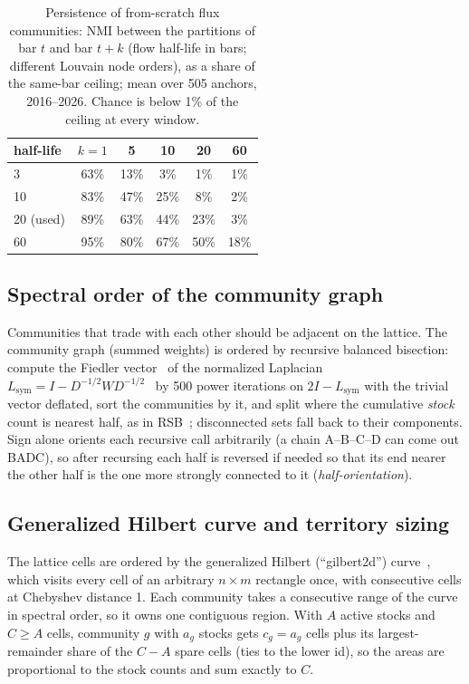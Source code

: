 \documentclass[preprint,3p,twocolumn]{elsarticle}
\begin{document}
\begin{table}[!htbp]
\centering\footnotesize
\begin{tabular}{lccccc}
\hline
half-life & $k=1$ & 5 & 10 & 20 & 60\\
\hline
3 & 63\% & 13\% & 3\% & 1\% & 1\%\\
10 & 83\% & 47\% & 25\% & 8\% & 2\%\\
20 (used) & 89\% & 63\% & 44\% & 23\% & 3\%\\
60 & 95\% & 80\% & 67\% & 50\% & 18\%\\
\hline
\end{tabular}
\caption{Persistence of from-scratch flux communities: NMI between the partitions of bar $t$ and bar $t+k$ (flow half-life in bars; different Louvain node orders), as a share of the same-bar ceiling; mean over 505 anchors, 2016--2026. Chance is below 1\% of the ceiling at every window.}
\label{Table:persist}
\end{table}

\subsection{Spectral order of the community graph}
Communities that trade with each other should be adjacent on the lattice. The community graph (summed weights) is ordered by recursive balanced bisection: compute the Fiedler vector~\cite{fiedler} of the normalized Laplacian $L_{\mathrm{sym}}=I-D^{-1/2}WD^{-1/2}$~\cite{chung} by 500 power iterations on $2I-L_{\mathrm{sym}}$ with the trivial vector deflated, sort the communities by it, and split where the cumulative \emph{stock} count is nearest half, as in RSB~\cite{rsb}; disconnected sets fall back to their components. Sign alone orients each recursive call arbitrarily (a chain A--B--C--D can come out BADC), so after recursing each half is reversed if needed so that its end nearer the other half is the one more strongly connected to it (\emph{half-orientation}).

\subsection{Generalized Hilbert curve and territory sizing}
The lattice cells are ordered by the generalized Hilbert (``gilbert2d'') curve~\cite{hilbert,gilbert}, which visits every cell of an arbitrary $n\times m$ rectangle once, with consecutive cells at Chebyshev distance 1. Each community takes a consecutive range of the curve in spectral order, so it owns one contiguous region. With $A$ active stocks and $C\ge A$ cells, community $g$ with $a_g$ stocks gets $c_g=a_g$ cells plus its largest-remainder share of the $C-A$ spare cells (ties to the lower id), so the areas are proportional to the stock counts and sum exactly to $C$.
\end{document}
